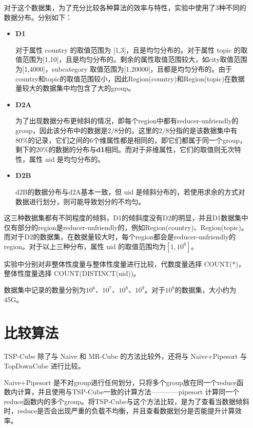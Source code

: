 对于这个数据集，为了充分比较各种算法的效率与特性，实验中使用了3种不同的数据分布。分别如下：
\begin{itemize}

\item \textbf{D1}

对于属性 country 的取值范围为 [1,3]，且是均匀分布的。对于属性 topic 的取值范围为[1,10]，且是均匀分布的。剩余的属性取值范围较大，如city取值范围为[1,4000]，subcategory 取值范围为[1,20000]，且都是均匀分布的。由于country和topic的取值范围较小，因此Region(country)和Region(topic)在数据量较大的数据集中均包含了大的group。

\item \textbf{D2A}

为了出现数据分布更倾斜的情况，即每个region中都有reducer-unfriendly的group，因此该分布中的数据是2/8分的。这里的2/8分指的是该数据集中有80\%的记录，它们之间的6个维属性都是相同的，即它们都属于同一个group，剩下的20\%的数据的分布与\textbf{d1}相同。而对于非维属性，它们的取值则无次特性，属性 uid 是均匀分布的。

\item \textbf{D2B}

d2B的数据分布与d2A基本一致，但 uid 是倾斜分布的，若使用求余的方式对数据进行划分，则可能导致划分的不均匀。

\end{itemize}

这三种数据集都有不同程度的倾斜，D1的倾斜度没有D2的明显，并且D1数据集中仅有部分的region是reducer-unfriendly的，例如Region(country)、Region(topic)。而对于D2的数据集，在数据量较大时，每个region都会是reducer-unfriendly的region。对于以上三种分布，属性 uid 的取值范围均为$[1,{10}^{6}]$。

实验中分别对非整体性度量与整体性度量进行比较，代数度量选择 COUNT(*)， 整体性度量选择 COUNT(DISTINCT(uid))。

数据集中记录的数量分别为${10}^{6}$、${10}^{7}$、${10}^{8}$、${10}^{9}$。对于${10}^{9}$的数据集，大小约为45G。


\section{比较算法}

TSP-Cube 除了与 Naive 和 MR-Cube 的方法比较外，还将与 Naive+Pipesort 与 TopDownCube \cite{lee2012efficient} 进行比较。

Naive+Pipesort 是不对group进行任何划分，只将多个group放在同一个reduce函数内计算，并且使用与TSP-Cube一致的计算方法————pipesort 计算同一个reduce函数内的多个group。将TSP-Cube与这个方法比较，是为了查看当数据倾斜时，reduce是否会出现严重的负载不均衡，并且查看数据划分是否能提升计算效率。


